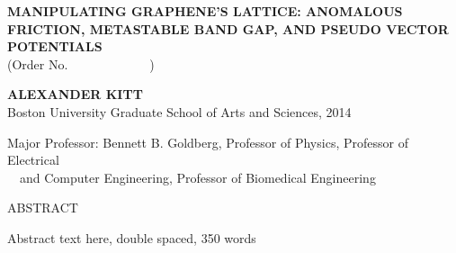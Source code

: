 \begin{center}

\textbf{MANIPULATING GRAPHENE'S LATTICE: ANOMALOUS FRICTION, METASTABLE BAND GAP, AND PSEUDO VECTOR POTENTIALS}\\

(Order No.\ \ \ \ \ \ \ \ \ \ \ \ \ )

\textbf{ALEXANDER KITT}\\
Boston University Graduate School of Arts and Sciences, 2014\\
\begin{singlespace}
	Major Professor: Bennett B. Goldberg, Professor of Physics, Professor of Electrical \\
	\qquad \qquad \qquad \quad \ \ and Computer Engineering, Professor of Biomedical Engineering
\end{singlespace}

ABSTRACT

\end{center}
\vspace{-15 pt}  %

Abstract text here, double spaced, 350 words

\newpage